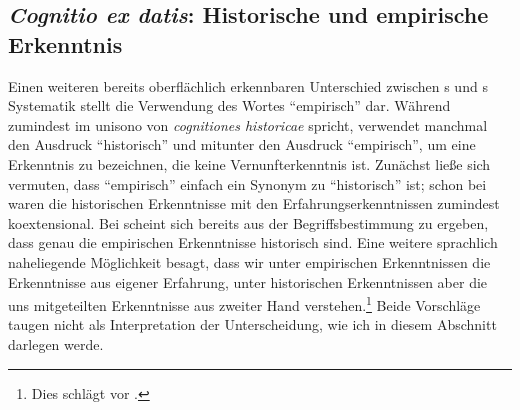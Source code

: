 \subsection{\emph{Cognitio ex datis}: Historische und empirische
Erkenntnis}\label{subsection:HistorischeundempirischeErkenntnis}
Einen weiteren bereits oberflächlich erkennbaren Unterschied zwischen
s und s
Systematik stellt die Verwendung des Wortes \enquote{empirisch} dar. Während
 zumindest im  unisono von \emph{cognitiones historicae} spricht, verwendet
 manchmal den Ausdruck \enquote{historisch} und mitunter
den Ausdruck \enquote{empirisch}, um eine Erkenntnis zu bezeichnen, die keine
Vernunfterkenntnis ist. Zunächst ließe sich vermuten, dass \enquote{empirisch}
einfach ein Synonym zu \enquote{historisch} ist; schon bei
 waren die
historischen Erkenntnisse mit den Erfahrungserkenntnissen zumindest
koextensional. Bei  scheint sich bereits aus der
Begriffsbestimmung zu ergeben, dass genau die empirischen Erkenntnisse
historisch sind. Eine weitere sprachlich naheliegende Möglichkeit besagt, dass
wir unter empirischen Erkenntnissen die Erkenntnisse aus eigener Erfahrung,
unter historischen Erkenntnissen aber die uns mitgeteilten Erkenntnisse aus
zweiter Hand verstehen.\footnote{Dies schlägt
 vor
\parencite[vgl.][140]{Kater:PolitikRechtGeschichte1999}.} Beide Vorschläge
taugen nicht als Interpretation der Unterscheidung, wie ich in diesem Abschnitt
darlegen werde.


